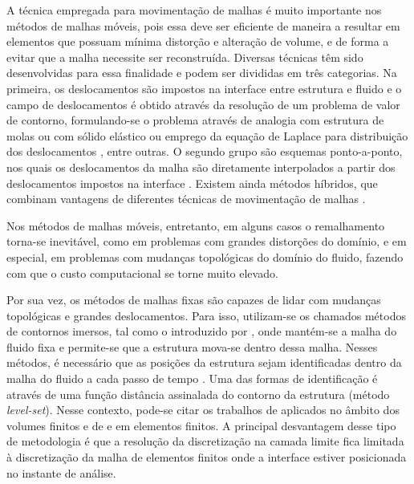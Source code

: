 A técnica empregada para movimentação de malhas é muito importante nos métodos de malhas móveis, pois essa deve ser eficiente de maneira a resultar em elementos que possuam mínima distorção e alteração de volume, e de forma a evitar que a malha necessite ser reconstruída. Diversas técnicas têm sido desenvolvidas para essa finalidade e podem ser divididas em três categorias. Na primeira, os deslocamentos são impostos na interface entre estrutura e fluido e o campo de deslocamentos é obtido através da resolução de um problema de valor de contorno, formulando-se o problema através de analogia com estrutura de molas \cite{BottassoDS:2005} ou com sólido elástico \cite{JohnsonT:1994,SteinTB:2004} ou emprego da equação de Laplace para distribuição dos deslocamentos \cite{KanchiM:2007}, entre outras. O segundo grupo são esquemas ponto-a-ponto, nos quais os deslocamentos da malha são diretamente interpolados a partir dos deslocamentos impostos na interface \cite{DoneaGH:1982,SanchesC:2014,TezduyarABJ:1993}. Existem ainda métodos híbridos, que combinam vantagens de diferentes técnicas de movimentação de malhas \cite{FernandesCS:2019,Lefrancois:2008}. 

Nos métodos de malhas móveis, entretanto, em alguns casos o remalhamento torna-se inevitável, como em problemas com grandes distorções do domínio, e em especial, em problemas com mudanças topológicas do domínio do fluido, fazendo com que o custo computacional se torne muito elevado.

Por sua vez, os métodos de malhas fixas são capazes de lidar com mudanças topológicas e grandes deslocamentos. Para isso, utilizam-se os chamados métodos de contornos imersos, tal como o introduzido por , onde mantém-se a malha do fluido fixa e permite-se que a estrutura mova-se dentro dessa malha. Nesses métodos, é necessário que as posições da estrutura sejam identificadas dentro da malha do fluido a cada passo de tempo \cite{MittalI:2005,WangRGF:2011}. Uma das formas de identificação é através de uma função distância assinalada do contorno da estrutura (método \textit{level-set}). Nesse contexto, pode-se citar os trabalhos de   aplicados no âmbito dos volumes finitos e de  e  em elementos finitos. A principal desvantagem desse tipo de metodologia é que a resolução da discretização na camada limite fica limitada à discretização da malha de elementos finitos onde a interface estiver posicionada no instante de análise.

